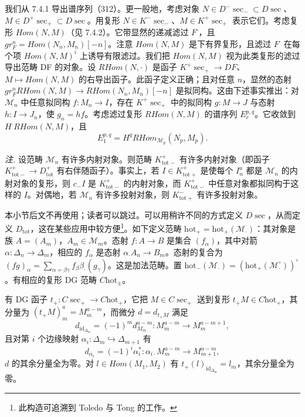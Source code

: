  我们从 7.4.1 导出谱序列（312）。更一般地，考虑对象 $N\in D^{-}\sec_{-}\subset D\sec$、$M\in D^{+}\sec_{+}\subset D\sec$。用复形 $N\in K^{-}\sec_{-}$、$M\in K^{+}\sec_{+}$ 表示它们。考虑复形 $Hom(N,M)$（见 7.4.2）。它带显然的递减滤过 $F^{\cdot}$，且 $gr^{n}_{F}=Hom(N_{n},M_{n})[-n]$。注意 $Hom(N,M)$ 是下有界复形，且滤过 $F^{\cdot}$ 在每个项 $Hom(N,M)^{i}$ 上诱导有限滤过。我们把 $Hom(N,M)$ 视为此类复形的滤过导出范畴 DF 的对象。设 $RHom(N,\cdot)$ 是函子 $K^{+}\sec_{+}\to DF$、$M\mapsto Hom(N,M)$ 的右导出函子。此函子定义正确；且对任意 $n$，显然的态射 $gr^{n}_{F}RHom(N,M)\to RHom(N_{n},M_{n})[-n]$ 是拟同构。这由下述事实推出：对 $\mathcal{M}_{n}$ 中任意拟同构 $f:M_{n}\to I$，存在 $K^{+}\sec_{+}$ 中的拟同构 $g:M\to J$ 与态射 $h:I\to J_{n}$，使 $g_{n}=hf$。考虑滤过复形 $RHom(N,M)$ 的谱序列 $E^{p,q}_{r}$。它收敛到 $H^{\cdot}RHom(N,M)$，且
\[
E^{p,q}_{1}=H^{q}RHom_{\mathcal{M}_{p}}(N_{p},M_{p}).
\]

 \emph{注.} 设范畴 $\mathcal{M}_{n}$ 有许多内射对象。则范畴 $K^{+}_{\mathrm{tot}-}$ 有许多内射对象（即函子 $K^{+}_{\mathrm{tot}-}\to D^{+}_{\mathrm{tot}}$ 有右伴随函子）。事实上，若 $I\in K^{+}_{\mathrm{tot}+}$ 是使每个 $I^{a}_{n}$ 都是 $\mathcal{M}_{n}$ 的内射对象的复形，则 $c_{-}I$
%
是 $K^{+}_{\mathrm{tot}-}$ 的内射对象，而 $K^{+}_{\mathrm{tot}-}$ 中任意对象都拟同构于这样的 $I$。对偶地，若 $\mathcal{M}_{n}$ 有许多投射对象，则 $K^{-}_{\mathrm{tot}+}$ 有许多投射对象。

 本小节后文不再使用；读者可以跳过。可以用稍许不同的方式定义 $D\sec$，从而定义 $D_{\mathrm{tot}}$，这在某些应用中较方便\footnote{此构造可追溯到 Toledo 与 Tong 的工作。}。如下定义范畴 $\mathrm{hot}_{+}=\mathrm{hot}_{+}(\mathcal{M}_{\cdot})$：其对象是族 $A=(A_{m})$，$A_{m}\in\mathcal{M}_{m}$。态射 $f:A\to B$ 是集合 $(f_{\alpha})$，其中对箭 $\alpha:\Delta_{n}\to\Delta_{m}$，相应的 $f_{\alpha}$ 是态射 $\alpha_{\cdot}A_{n}\to B_{m}$。态射的复合为 $(fg)_{\alpha}=\sum_{\alpha=\beta\gamma}f_{\beta}\beta_{\cdot}(g_{\gamma})$。这是加法范畴。置 $\mathrm{hot}_{-}(\mathcal{M}_{\cdot})=(\mathrm{hot}_{+}(\mathcal{M}^{\circ}_{\cdot}))^{\circ}$。有相应的复形 DG 范畴 $C\mathrm{hot}_{\pm}$。

有 DG 函子 $t_{+}:C\sec_{+}\to C\mathrm{hot}_{+}$，它把 $M\in C\sec_{+}$ 送到复形 $t_{+}M\in C\mathrm{hot}_{+}$，其分量为 $(t_{+}M)^{a}_{m}=M^{a-m}_{m}$，而微分 $d=d_{t_{+}M}$ 满足
\[
d_{\mathrm{id}_{\Delta_{m}}}=(-1)^{m}d^{a-m}_{M_{m}}:M^{a-m}_{m}\to M^{a-m+1}_{m},
\]
且对第 $i$ 个边缘映射 $\alpha_{i}:\Delta_{m}\hookrightarrow\Delta_{m+1}$ 有
\[
d_{\alpha_{i}}=(-1)^{i}\alpha^{*}_{i}:\alpha_{i\cdot}M^{a-m}_{m}\to M^{a-m}_{m+1},
\]
$d$ 的其余分量全为零。对 $l\in Hom(M_{1},M_{2})$ 有 $t_{+}(l)_{\mathrm{id}_{\Delta_{m}}}=l_{m}$，其余分量全为零。

